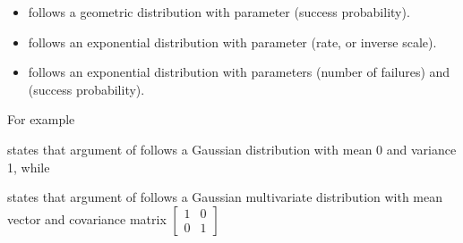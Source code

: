 \documentclass[letterpaper,10pt,english]{sphinxmanual}
\begin{document}
\begin{itemize}
\item {} 
  follows a geometric distribution with parameter  (success probability).

\item {} 
  follows an exponential distribution with parameter  (rate, or inverse scale).

\item {} 
  follows an exponential distribution with parameters  (number of failures) and  (success probability).

\end{itemize}

For example

\begin{sphinxVerbatim}[commandchars=\\\{\}]
  
\end{sphinxVerbatim}

states that argument  of  follows a Gaussian distribution with mean 0 and variance 1, while

\begin{sphinxVerbatim}[commandchars=\\\{\}]
 \PYG{p}{[}\PYG{p}{]} \PYG{p}{[}\PYG{p}{[}\PYG{p}{]}\PYG{p}{[}\PYG{p}{]}\PYG{p}{]}
\end{sphinxVerbatim}

states that argument  of  follows a Gaussian multivariate distribution with mean vector \sphinxcode{\sphinxupquote{{[}0,0{]}}} and covariance matrix \(\begin{bmatrix} 1 & 0 \\ 0 & 1 \end{bmatrix}\)
\end{document}
